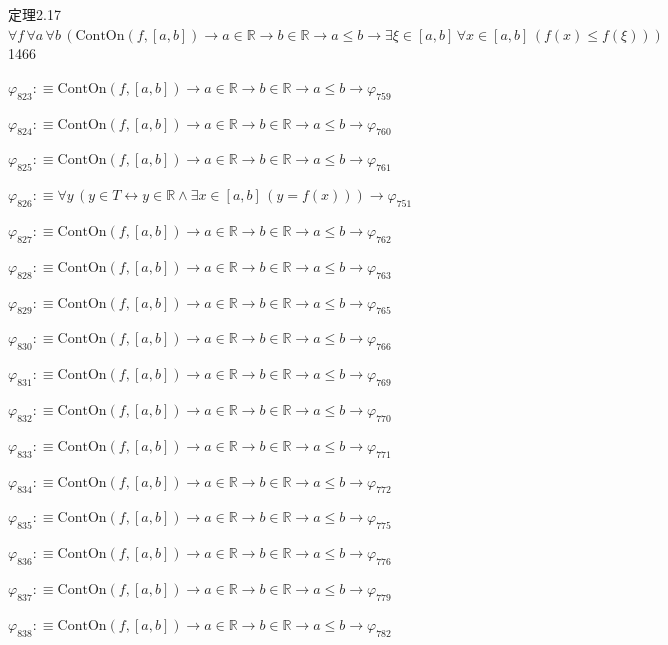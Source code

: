 \begin{fullproof}{定理2.17}{$\forall f\,\forall a\,\forall b\,(\mathrm{ContOn}(f,[a,b]) \to a \in \mathbb{R} \to b \in \mathbb{R} \to a \leq b \to \exists \xi \in [a,b]\,\forall x \in [a,b]\,(f(x) \leq f(\xi)))$}{1466}
\begin{abbrevlist}
\item $\varphi_{823} :\equiv \mathrm{ContOn}(f,[a,b]) \to a \in \mathbb{R} \to b \in \mathbb{R} \to a \leq b \to \varphi_{759}$
\item $\varphi_{824} :\equiv \mathrm{ContOn}(f,[a,b]) \to a \in \mathbb{R} \to b \in \mathbb{R} \to a \leq b \to \varphi_{760}$
\item $\varphi_{825} :\equiv \mathrm{ContOn}(f,[a,b]) \to a \in \mathbb{R} \to b \in \mathbb{R} \to a \leq b \to \varphi_{761}$
\item $\varphi_{826} :\equiv \forall y\,(y \in T \leftrightarrow y \in \mathbb{R} \land \exists x \in [a,b]\,(y = f(x))) \to \varphi_{751}$
\item $\varphi_{827} :\equiv \mathrm{ContOn}(f,[a,b]) \to a \in \mathbb{R} \to b \in \mathbb{R} \to a \leq b \to \varphi_{762}$
\item $\varphi_{828} :\equiv \mathrm{ContOn}(f,[a,b]) \to a \in \mathbb{R} \to b \in \mathbb{R} \to a \leq b \to \varphi_{763}$
\item $\varphi_{829} :\equiv \mathrm{ContOn}(f,[a,b]) \to a \in \mathbb{R} \to b \in \mathbb{R} \to a \leq b \to \varphi_{765}$
\item $\varphi_{830} :\equiv \mathrm{ContOn}(f,[a,b]) \to a \in \mathbb{R} \to b \in \mathbb{R} \to a \leq b \to \varphi_{766}$
\item $\varphi_{831} :\equiv \mathrm{ContOn}(f,[a,b]) \to a \in \mathbb{R} \to b \in \mathbb{R} \to a \leq b \to \varphi_{769}$
\item $\varphi_{832} :\equiv \mathrm{ContOn}(f,[a,b]) \to a \in \mathbb{R} \to b \in \mathbb{R} \to a \leq b \to \varphi_{770}$
\item $\varphi_{833} :\equiv \mathrm{ContOn}(f,[a,b]) \to a \in \mathbb{R} \to b \in \mathbb{R} \to a \leq b \to \varphi_{771}$
\item $\varphi_{834} :\equiv \mathrm{ContOn}(f,[a,b]) \to a \in \mathbb{R} \to b \in \mathbb{R} \to a \leq b \to \varphi_{772}$
\item $\varphi_{835} :\equiv \mathrm{ContOn}(f,[a,b]) \to a \in \mathbb{R} \to b \in \mathbb{R} \to a \leq b \to \varphi_{775}$
\item $\varphi_{836} :\equiv \mathrm{ContOn}(f,[a,b]) \to a \in \mathbb{R} \to b \in \mathbb{R} \to a \leq b \to \varphi_{776}$
\item $\varphi_{837} :\equiv \mathrm{ContOn}(f,[a,b]) \to a \in \mathbb{R} \to b \in \mathbb{R} \to a \leq b \to \varphi_{779}$
\item $\varphi_{838} :\equiv \mathrm{ContOn}(f,[a,b]) \to a \in \mathbb{R} \to b \in \mathbb{R} \to a \leq b \to \varphi_{782}$

\end{abbrevlist}
\end{fullproof}
